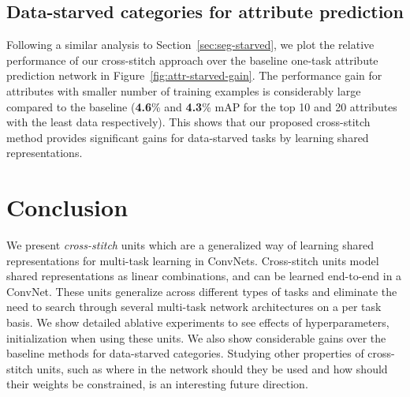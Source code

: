 \documentclass[10pt,twocolumn,letterpaper]{article}
\begin{document}
\begin{table}[t]
\centering
\setlength{\tabcolsep}{0.2em}
\caption{Object detection and attribute prediction results on the attribute PASCAL~\cite{apascal} 2008 dataset}
\label{tbl:obj-exp}
{\small
{}
\vspace{-0.1in}
}
\end{table}


\subsection{Data-starved categories for attribute prediction}
Following a similar analysis to Section~\ref{sec:seg-starved}, we plot the relative performance of our cross-stitch approach over the baseline one-task attribute prediction network in Figure~\ref{fig:attr-starved-gain}. The performance gain for attributes with smaller number of training examples is considerably large compared to the baseline (\textbf{4.6}\% and \textbf{4.3}\% mAP for the top 10 and 20 attributes with the least data respectively). This shows that our proposed cross-stitch method provides significant gains for data-starved tasks by learning shared representations.

\section{Conclusion}
We present \emph{cross-stitch} units which are a generalized way of learning shared representations for multi-task learning in ConvNets. Cross-stitch units model shared representations as linear combinations, and can be learned end-to-end in a ConvNet. These units generalize across different types of tasks and eliminate the need to search through several multi-task network architectures on a per task basis. We show detailed ablative experiments to see effects of hyperparameters, initialization \etc when using these units. We also show considerable gains over the baseline methods for data-starved categories. Studying other properties of cross-stitch units, such as where in the network should they be used and how should their weights be constrained, is an interesting future direction.
\end{document}
